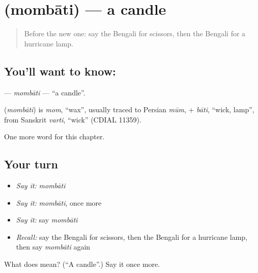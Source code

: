 \section[\texorpdfstring{\bn{মোমবাতি} (mombāti)}{মোমবাতি (mombāti)}]{ (mombāti) — a candle}

\label{lesson:BN-C110-mombati}



\begin{quote}
Before the new one: say the Bengali for scissors, then the Bengali for a hurricane lamp.
\end{quote}

\subsection*{You'll want to know: }
\textbf{} — \emph{mombāti} — \textquotedblleft{}a candle\textquotedblright{}.

\begin{cousinweb}
\textbf{} (\emph{mombāti}) is \emph{mom}, \textquotedblleft{}wax\textquotedblright{}, usually traced to Persian \emph{mūm}, + \emph{bāti}, \textquotedblleft{}wick, lamp\textquotedblright{}, from Sanskrit \emph{varti}, \textquotedblleft{}wick\textquotedblright{} (CDIAL 11359).
\end{cousinweb}

\begin{grammarlens}[title={What you've built}]
One more word for this chapter.
\end{grammarlens}

\subsection*{Your turn}
\begin{itemize}
\raggedright
  \item \emph{Say it:} \emph{mombāti}
  \item \emph{Say it:} \emph{mombāti}, once more
  \item \emph{Say it:} say \emph{mombāti}
  \item \emph{Recall:} say the Bengali for scissors, then the Bengali for a hurricane lamp, then say \emph{mombāti} again
\end{itemize}

\begin{tcolorbox}[breakable,colback=teal!4,colframe=teal!35!black,title={Before you move on}]
What does  mean? (\textquotedblleft{}A candle\textquotedblright{}.) Say it once more.
\end{tcolorbox}
